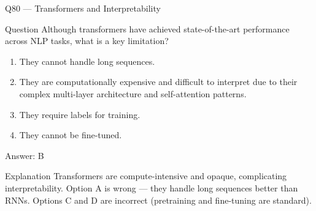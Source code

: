 \documentclass[aspectratio=169,8pt]{beamer}
\begin{document}
	\begin{frame}{Q80 --- Transformers and Interpretability}
		\begin{block}{Question}
			Although transformers have achieved state-of-the-art performance across NLP tasks, what is a key limitation?
		\end{block}
		\begin{enumerate}
			\item They cannot handle long sequences.
			\item They are computationally expensive and difficult to interpret due to their complex multi-layer architecture and self-attention patterns.
			\item They require labels for training.
			\item They cannot be fine-tuned.
		\end{enumerate}
		\begin{exampleblock}{Answer: B}\end{exampleblock}
		\begin{block}{Explanation}
			Transformers are compute-intensive and opaque, complicating interpretability. Option A is wrong --- they handle long sequences better than RNNs. Options C and D are incorrect (pretraining and fine-tuning are standard).
		\end{block}
	\end{frame}
	
	
	
	
	
\end{document}
